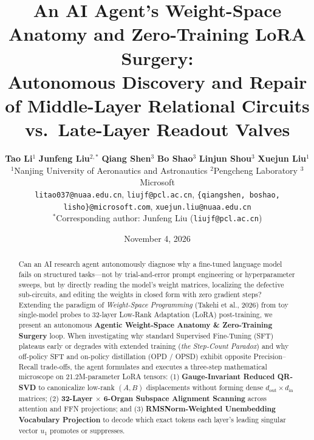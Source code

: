 \documentclass[11pt,a4paper]{article}
\title{\textbf{An AI Agent's Weight-Space Anatomy and Zero-Training LoRA Surgery:\\Autonomous Discovery and Repair of Middle-Layer Relational Circuits vs.\ Late-Layer Readout Valves}}
\author{
  \textbf{Tao Li}$^{1}$ \quad
  \textbf{Junfeng Liu}$^{2,*}$ \quad
  \textbf{Qiang Shen}$^{3}$ \quad
  \textbf{Bo Shao}$^{3}$ \quad
  \textbf{Linjun Shou}$^{3}$ \quad
  \textbf{Xuejun Liu}$^{1}$ \\[4pt]
  $^{1}$Nanjing University of Aeronautics and Astronautics \quad
  $^{2}$Pengcheng Laboratory \quad
  $^{3}$Microsoft \\[2pt]
  \texttt{litao037@nuaa.edu.cn}, \; \texttt{liujf@pcl.ac.cn}, \; \texttt{\{qiangshen, boshao, lisho\}@microsoft.com}, \; \texttt{xuejun.liu@nuaa.edu.cn} \\[2pt]
  {\small $^{*}$Corresponding author: Junfeng Liu (\texttt{liujf@pcl.ac.cn})}
}
\date{November 4, 2026}
\begin{document}
\maketitle

\begin{abstract}
Can an AI research agent autonomously diagnose why a fine-tuned language model fails on structured tasks—not by trial-and-error prompt engineering or hyperparameter sweeps, but by directly reading the model's weight matrices, localizing the defective sub-circuits, and editing the weights in closed form with zero gradient steps? Extending the paradigm of \emph{Weight-Space Programming} (Takehi et al., 2026) from toy single-model probes to 32-layer Low-Rank Adaptation (LoRA) post-training, we present an autonomous \textbf{Agentic Weight-Space Anatomy \& Zero-Training Surgery} loop. When investigating why standard Supervised Fine-Tuning (SFT) plateaus early or degrades with extended training (\emph{the Step-Count Paradox}) and why off-policy SFT and on-policy distillation (OPD / OPSD) exhibit opposite Precision--Recall trade-offs, the agent formulates and executes a three-step mathematical microscope on 21.2M-parameter LoRA tensors: (1) \textbf{Gauge-Invariant Reduced QR-SVD} to canonicalize low-rank $(A,B)$ displacements without forming dense $d_{\text{out}} \times d_{\text{in}}$ matrices; (2) \textbf{32-Layer $\times$ 6-Organ Subspace Alignment Scanning} across attention and FFN projections; and (3) \textbf{RMSNorm-Weighted Unembedding Vocabulary Projection} to decode which exact tokens each layer's leading singular vector $u_1$ promotes or suppresses.


\end{abstract}
\end{document}
